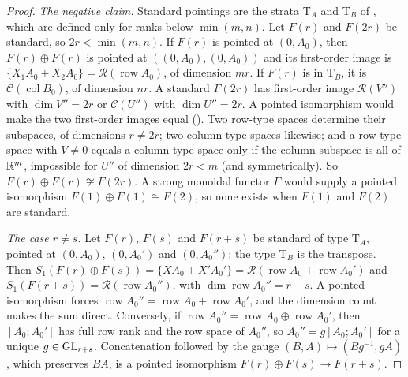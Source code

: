 \begin{proof}
\emph{The negative claim.} Standard pointings are the strata $\mathrm T_A$ and $\mathrm T_B$ of ,
which are defined only for ranks below $\min(m,n)$. Let $F(r)$ and $F(2r)$ be standard, so $2r<\min(m,n)$. If $F(r)$ is
pointed at $(0,A_0)$, then $F(r)\oplus F(r)$ is pointed at $((0,A_0),(0,A_0))$ and its first-order image is
$\{X_1A_0+X_2A_0\}=\mathcal R(\operatorname{row}A_0)$, of dimension $mr$. If $F(r)$ is in $\mathrm T_B$, it is
$\mathcal C(\operatorname{col}B_0)$, of dimension $nr$. A standard $F(2r)$ has first-order image $\mathcal R(V'')$ with
$\dim V''=2r$ or $\mathcal C(U'')$ with $\dim U''=2r$. A pointed isomorphism would make the two first-order images equal
(). Two row-type spaces determine their subspaces, of dimensions $r\ne2r$; two column-type spaces
likewise; and a row-type space with $V\ne0$ equals a column-type space only if the column subspace is all of $\mathbb{R}^m$,
impossible for $U''$ of dimension $2r<m$ (and symmetrically). So $F(r)\oplus F(r)\not\cong F(2r)$. A strong monoidal
functor $F$ would supply a pointed isomorphism $F(1)\oplus F(1)\cong F(2)$, so none exists when $F(1)$ and $F(2)$ are
standard.

\emph{The case $r\ne s$.} Let $F(r)$, $F(s)$ and $F(r+s)$ be standard of type $\mathrm T_A$, pointed at $(0,A_0)$,
$(0,A_0')$ and $(0,A_0'')$; the type $\mathrm T_B$ is the transpose. Then
$S_1(F(r)\oplus F(s))=\{XA_0+X'A_0'\}=\mathcal R(\operatorname{row}A_0+\operatorname{row}A_0')$ and
$S_1(F(r+s))=\mathcal R(\operatorname{row}A_0'')$, with $\dim\operatorname{row}A_0''=r+s$. A pointed isomorphism forces
$\operatorname{row}A_0''=\operatorname{row}A_0+\operatorname{row}A_0'$, and the dimension count makes the sum direct.
Conversely, if $\operatorname{row}A_0''=\operatorname{row}A_0\oplus\operatorname{row}A_0'$, then $[A_0;A_0']$ has full row
rank and the row space of $A_0''$, so $A_0''=g[A_0;A_0']$ for a unique $g\in\mathrm{GL}_{r+s}$. Concatenation followed by the gauge
$(B,A)\mapsto(Bg^{-1},gA)$, which preserves $BA$, is a pointed isomorphism $F(r)\oplus F(s)\to F(r+s)$.


\end{proof}

